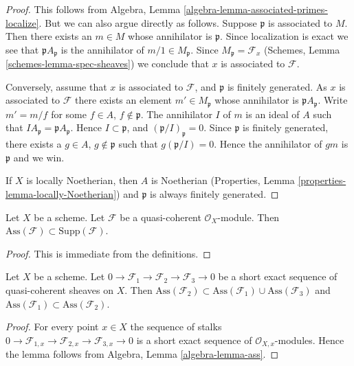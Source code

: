 \begin{proof}
This follows from
Algebra, Lemma \ref{algebra-lemma-associated-primes-localize}.
But we can also argue directly as follows.
Suppose $\mathfrak p$ is associated to $M$.
Then there exists an $m \in M$ whose annihilator is $\mathfrak p$.
Since localization is exact we see that
$\mathfrak pA_{\mathfrak p}$ is the annihilator of
$m/1 \in M_{\mathfrak p}$. Since $M_{\mathfrak p} = \mathcal{F}_x$
(Schemes, Lemma \ref{schemes-lemma-spec-sheaves})
we conclude that $x$ is associated to $\mathcal{F}$.

\medskip\noindent
Conversely, assume that $x$ is associated to $\mathcal{F}$,
and $\mathfrak p$ is finitely generated.
As $x$ is associated to $\mathcal{F}$
there exists an element $m' \in M_{\mathfrak p}$ whose
annihilator is $\mathfrak pA_{\mathfrak p}$. Write
$m' = m/f$ for some $f \in A$, $f \not \in \mathfrak p$.
The annihilator $I$ of $m$ is an ideal of $A$ such that
$IA_{\mathfrak p} = \mathfrak pA_{\mathfrak p}$. Hence
$I \subset \mathfrak p$, and $(\mathfrak p/I)_{\mathfrak p} = 0$.
Since $\mathfrak p$ is finitely generated,
there exists a $g \in A$, $g \not \in \mathfrak p$ such that
$g(\mathfrak p/I) = 0$. Hence the annihilator of $gm$ is
$\mathfrak p$ and we win.

\medskip\noindent
If $X$ is locally Noetherian, then $A$ is Noetherian
(Properties, Lemma \ref{properties-lemma-locally-Noetherian})
and $\mathfrak p$ is always finitely generated.
\end{proof}

\begin{lemma}
\label{lemma-ass-support}
Let $X$ be a scheme.
Let $\mathcal{F}$ be a quasi-coherent $\mathcal{O}_X$-module.
Then $\text{Ass}(\mathcal{F}) \subset \text{Supp}(\mathcal{F})$.
\end{lemma}

\begin{proof}
This is immediate from the definitions.
\end{proof}

\begin{lemma}
\label{lemma-ses-ass}
Let $X$ be a scheme.
Let $0 \to \mathcal{F}_1 \to \mathcal{F}_2 \to \mathcal{F}_3 \to 0$
be a short exact sequence of quasi-coherent sheaves on $X$.
Then
$\text{Ass}(\mathcal{F}_2) \subset
\text{Ass}(\mathcal{F}_1) \cup \text{Ass}(\mathcal{F}_3)$
and
$\text{Ass}(\mathcal{F}_1) \subset \text{Ass}(\mathcal{F}_2)$.
\end{lemma}

\begin{proof}
For every point $x \in X$ the sequence of stalks
$0 \to \mathcal{F}_{1, x} \to \mathcal{F}_{2, x} \to \mathcal{F}_{3, x} \to 0$
is a short exact sequence of $\mathcal{O}_{X, x}$-modules.
Hence the lemma follows from
Algebra, Lemma \ref{algebra-lemma-ass}.
\end{proof}

